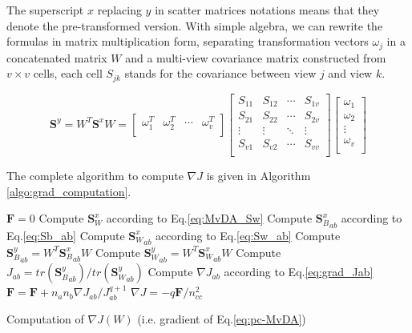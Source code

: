         The superscript $x$ replacing $y$ in scatter matrices notations means that they denote the pre-transformed version. With simple algebra, we can rewrite the formulas in matrix multiplication form, separating transformation vectors $\omega_j$ in a concatenated matrix $W$ and a multi-view covariance matrix constructed from $v\times v$ cells, each cell $S_{jk}$ stands for the covariance between view $j$ and view $k$.

        \begin{equation}
            \boldsymbol{S}^y=W^T\boldsymbol{S}^xW=\left[\begin{matrix}\omega_1^T&\omega_2^T&\cdots&\omega_v^T\\\end{matrix}\right]\left[\begin{matrix}S_{11}&S_{12}&\cdots&S_{1v}\\S_{21}&S_{22}&\cdots&S_{2v}\\\vdots&\vdots&\ddots&\vdots\\S_{v1}&S_{v2}&\cdots&S_{vv}\\\end{matrix}\right]\left[\begin{matrix}\omega_1\\\omega_2\\\vdots\\\omega_v\\\end{matrix}\right]
        \end{equation}

        The complete algorithm to compute $\nabla J$ is given in Algorithm \ref{algo:grad_computation}.

        \begin{algorithm}
            \SetEndCharOfAlgoLine{\relax}
            $\boldsymbol{F} = 0$\;
            Compute $\boldsymbol{S}_W^x$ according to Eq.\eqref{eq:MvDA_Sw}\;
             {
                 {
                    Compute ${\boldsymbol{S}_B^x}_{ab}$ according to Eq.\eqref{eq:Sb_ab}\;
                    Compute ${\boldsymbol{S}_W^x}_{ab}$ according to Eq.\eqref{eq:Sw_ab}\;
                    Compute ${\boldsymbol{S}_B^y}_{ab}=W^T{\boldsymbol{S}_B^x}_{ab}W$\;
                    Compute ${\boldsymbol{S}_W^y}_{ab}=W^T{\boldsymbol{S}_W^x}_{ab}W$\;
                    Compute $J_{ab}=tr\left({\boldsymbol{S}_B^y}_{ab}\right)/tr\left({\boldsymbol{S}_W^y}_{ab}\right)$\;
                    Compute $\nabla J_{ab}$ according to Eq.\eqref{eq:grad_Jab}\;
                    $\boldsymbol{F} = \boldsymbol{F} + n_an_b\nabla J_{ab}/J_{ab}^{q+1}$\;
                }
            }
            $\nabla J = {-q\boldsymbol{F}}/{n_{cc}^2}$\;
            \caption{Computation of $\nabla J\left(W\right)$ (i.e. gradient of Eq.\eqref{eq:pc-MvDA})}
            \label{algo:grad_computation}
        \end{algorithm}

